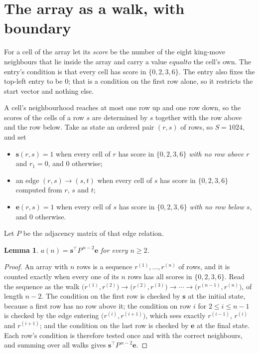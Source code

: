 \documentclass[11pt,a4paper]{article}
\theoremstyle{plain}
\newtheorem{lemma}[theorem]{Lemma}
\theoremstyle{definition}
\begin{document}
\section{The array as a walk, with boundary}

For a cell of the array let its \emph{score} be the number of the eight king-move neighbours that lie inside
the array and carry a value $equal to$ the cell's own. The entry's condition is that every cell
has score in $\{0,2,3,6\}$. The entry also fixes the top-left entry to be $0$; that is a condition on the first row alone, so it restricts the start vector and nothing else.

A cell's neighbourhood reaches at most one row up and one row down, so the scores of the
cells of a row $s$ are determined by $s$ together with the row above and the row below.
Take as state an ordered pair $(r,s)$ of rows, so $S=1024$, and set
\begin{itemize}
\item $\mathbf{s}(r,s)=1$ when every cell of $r$ has score in $\{0,2,3,6\}$ \emph{with no row
above $r$} and $r_1=0$, and $0$ otherwise;
\item an edge $(r,s)\to(s,t)$ when every cell of $s$ has score in $\{0,2,3,6\}$ computed from
$r$, $s$ and $t$;
\item $\mathbf{e}(r,s)=1$ when every cell of $s$ has score in $\{0,2,3,6\}$ \emph{with no row
below $s$}, and $0$ otherwise.
\end{itemize}
Let $P$ be the adjacency matrix of that edge relation.

\begin{lemma}\label{lem:walk}
$a(n)=\mathbf{s}^{\!\top}P^{\,n-2}\mathbf{e}$ for every $n\ge2$.
\end{lemma}

\begin{proof}
An array with $n$ rows is a sequence $r^{(1)},\dots,r^{(n)}$ of rows, and it is counted
exactly when every one of its $n$ rows has all scores in $\{0,2,3,6\}$. Read the sequence as the
walk $\bigl(r^{(1)},r^{(2)}\bigr)\to\bigl(r^{(2)},r^{(3)}\bigr)\to\cdots\to
\bigl(r^{(n-1)},r^{(n)}\bigr)$, of length $n-2$. The condition on the first row is
checked by $\mathbf{s}$ at the initial state, because a first row has no row above it; the
condition on row $i$ for $2\le i\le n-1$ is checked by the edge entering
$\bigl(r^{(i)},r^{(i+1)}\bigr)$, which sees exactly $r^{(i-1)}$, $r^{(i)}$ and
$r^{(i+1)}$; and the condition on the last row is checked by $\mathbf{e}$ at the final
state. Each row's condition is therefore tested once and with the correct neighbours, and
summing over all walks gives $\mathbf{s}^{\!\top}P^{\,n-2}\mathbf{e}$.
\end{proof}
\end{document}
